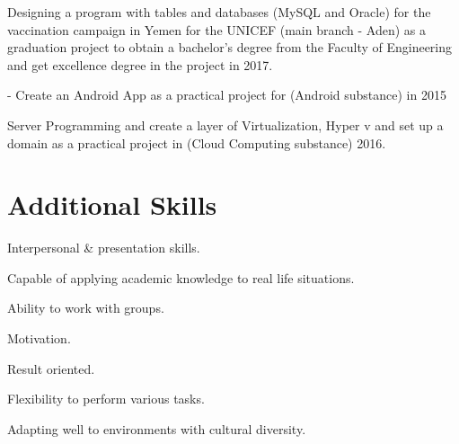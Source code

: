 \documentclass[letterpaper]{deedy-resume} %
\begin{document}
\begin{minipage}[t]{0.66\textwidth}

\begin{tightitemize}
\item Designing a program with tables and databases (MySQL and Oracle) for the vaccination campaign in Yemen for the UNICEF (main branch - Aden) as a graduation project to obtain a bachelor's degree from the Faculty of Engineering and get excellence degree in the project in 2017.
\item -	Create  an Android App as a practical project for (Android substance) in 2015 
\item Server Programming and create a layer of Virtualization, Hyper v and set up
a domain as a practical project in (Cloud Computing substance) 2016.

\end{tightitemize}
\section{Additional Skills}
\begin{tightitemize}

\item Interpersonal & presentation skills.
\item Capable of applying academic knowledge to real life situations.
\item 	Ability to work with groups.
\item 	Motivation.
\item Result oriented.
\item Flexibility to perform various tasks.
\item 	Adapting well to environments with cultural diversity.
\end{tightitemize}
\sectionspace %


\sectionspace %


\end{minipage}
\end{document}
